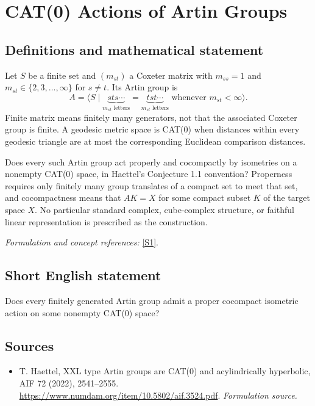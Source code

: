\documentclass[11pt]{article}
\begin{document}
\section*{\texorpdfstring{CAT(0) Actions of Artin Groups}{CAT(0) Actions of Artin Groups}}\label{statement}
\subsection{Definitions and mathematical statement}
Let $S$ be a finite set and $(m_{st})$ a Coxeter matrix with $m_{ss}=1$ and $m_{st}\in\{2,3,\ldots,\infty\}$ for $s\ne t$. Its Artin group is
\[
 A=\langle S\mid
 \underbrace{sts\cdots}_{m_{st}\text{ letters}}=
 \underbrace{tst\cdots}_{m_{st}\text{ letters}}
 \text{ whenever }m_{st}<\infty\rangle.
\]
Finite matrix means finitely many generators, not that the associated Coxeter group is finite. A geodesic metric space is CAT(0) when distances within every geodesic triangle are at most the corresponding Euclidean comparison distances.

Does every such Artin group act properly and cocompactly by isometries on a nonempty CAT(0) space, in Haettel's Conjecture 1.1 convention? Properness requires only finitely many group translates of a compact set to meet that set, and cocompactness means that $AK=X$ for some compact subset $K$ of the target space $X$. No particular standard complex, cube-complex structure, or faithful linear representation is prescribed as the construction.
\par\smallskip\textit{Formulation and concept references:} \href{https://www.numdam.org/item/10.5802/aif.3524.pdf}{[S1]}.

\subsection{Short English statement}
Does every finitely generated Artin group admit a proper cocompact isometric action on some nonempty CAT(0) space?
\subsection{Sources}
\begin{itemize}
\item[S1]T. Haettel, XXL type Artin groups are CAT(0) and acylindrically hyperbolic, AIF 72 (2022), 2541–2555.
\url{https://www.numdam.org/item/10.5802/aif.3524.pdf}.
\textit{Formulation source.}
\end{itemize}
\end{document}
